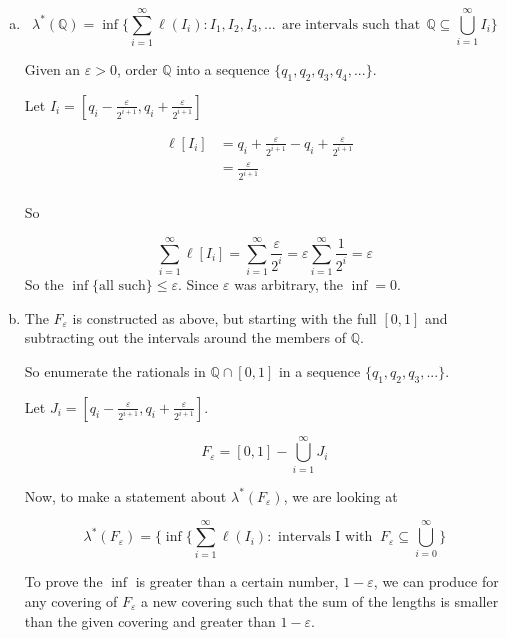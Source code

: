 \documentclass[11pt,oneside]{article}
\numberwithin{equation}{section}
\theoremstyle{definition}
\def\QQ{\mathbb{Q}}
\begin{document}
\begin{solution}
  \begin{enumerate}[(a)]
  \item
    $$
    \lambda ^* ( \QQ) = \inf \{ \sum _{i=1} ^\infty \ell ( I _ i ) : I_1, I_2, I_3, ... \ \ \text{are intervals such that} \ \ \QQ \subseteq \bigcup \limits _ {i=1} ^ \infty I_i \} 
    $$
    
    Given an $\varepsilon > 0$, order $\QQ $ into a sequence $ \{ q_1, q_2, q_3, q_4, ... \}$. 
    
    Let $I_i = [q_i - \frac{\varepsilon}{2^{i+1}},  q_i + \frac{\varepsilon}{2^{i+1}} ] $ 
    
    \begin{align*}
      \ell [ I_i ] & = q_i + \frac{\varepsilon}{2^{i+1}} - q_i +  \frac{\varepsilon}{2^{i+1}} & \\  
      & = \frac{\varepsilon}{2^{i+1}} & \\  
    \end{align*}
    
    So

    $$
    \sum \limits _ { i=1} ^ \infty \ell [I_i] =  \sum \limits _ { i=1} ^ \infty \frac{\varepsilon}{2^i} = \varepsilon \sum \limits _ {i=1} ^ \infty \frac{1}{2^i}= \varepsilon 
    $$
    So the $ \inf \{ \text{all such} \} \leq \varepsilon$.  Since $\varepsilon$ was arbitrary, the $ \inf = 0$.
    \item
      The $F_\varepsilon$ is constructed as above, but starting with the full $[0,1]$ and subtracting out the intervals around the members of $\QQ$.

      So enumerate the rationals in $ \QQ \cap [0,1]$ in a sequence $ \{ q_1, q_2, q_3, ... \}$.

      Let $J_i =  [ q_i - \frac{\varepsilon}{2^{i+1}},  q_i + \frac{\varepsilon}{2^{i+1}}]$. 
      
      $$
      F_\varepsilon = [0, 1] - \bigcup \limits _ {i = 1} ^ \infty J_i
      $$

      Now, to make a statement about $\lambda ^* (F _ \varepsilon)$, we are looking at

      $$
      \lambda ^ * (F_\varepsilon) = \{ \inf \{ \sum \limits _ { i = 1 } ^ \infty \ell ( I_i ) : \text { intervals I with } \ F_\varepsilon \subseteq \bigcup \limits _ { i = 0 } ^ \infty \}
      $$

      To prove the $\inf$ is greater than a certain number,
      $1-\varepsilon$, we can produce for any covering of
      $F_\varepsilon$ a new covering such that the sum of the lengths
      is smaller than the given covering and greater than $1 -
      \varepsilon$.
          

\end{enumerate}
\end{solution}
\end{document}

